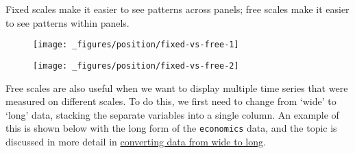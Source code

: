 Fixed scales make it easier to see patterns across panels; free scales
make it easier to see patterns within panels.

\begin{Shaded}
\begin{Highlighting}[]
\StringTok{ }\StringTok{ }
\StringTok{  }\NormalTok{() +}
\StringTok{  }\NormalTok{(} \NormalTok{, } \NormalTok{) }
\StringTok{ }
\end{Highlighting}
\end{Shaded}

\begin{figure}[H]
  \centering
  \texttt{[image: \_figures/position/fixed-vs-free-1]}%
\end{figure}

\begin{Shaded}
\begin{Highlighting}[]
\StringTok{ } \NormalTok{)}
\end{Highlighting}
\end{Shaded}

\begin{figure}[H]
  \centering
  \texttt{[image: \_figures/position/fixed-vs-free-2]}
\end{figure}

Free scales are also useful when we want to display multiple time series
that were measured on different scales. To do this, we first need to
change from `wide' to `long' data, stacking the separate variables into
a single column. An example of this is shown below with the long form of
the \texttt{economics} data, and the topic is discussed in more detail
in \protect\hyperlink{sec:spread-gather}{converting data from wide to
long}. 

